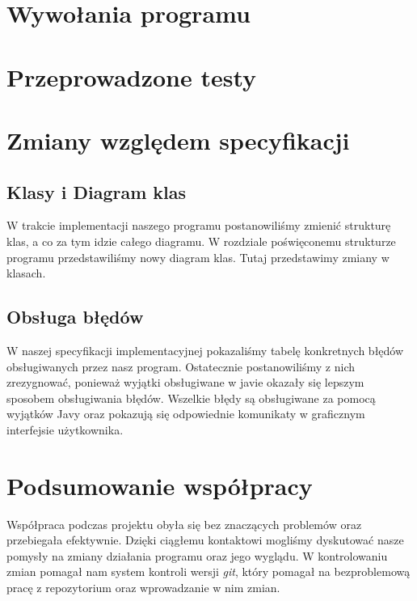 \documentclass[10pt, a4paper]{report}
\begin{document}
\newpage

\section{Wywołania programu}\label{sec:wywołania-programu}


\section{Przeprowadzone testy}\label{sec:przeprowadzone-testy}


\section{Zmiany względem specyfikacji}\label{sec:zmiany-względem-specyfikacji}

\subsection{Klasy i Diagram klas}\label{subsec:klasy-i-diagram-klas}
W trakcie implementacji naszego programu postanowiliśmy zmienić strukturę klas, a co za tym idzie całego diagramu. W rozdziale poświęconemu strukturze programu przedstawiliśmy nowy diagram klas.
Tutaj przedstawimy zmiany w klasach.

\subsection{Obsługa błędów}\label{subsec:obsługa-błędów}
W naszej specyfikacji implementacyjnej pokazaliśmy tabelę konkretnych błędów obsługiwanych przez nasz program. Ostatecznie postanowiliśmy z nich zrezygnować, ponieważ wyjątki obsługiwane w javie okazały się lepszym
sposobem obsługiwania błędów. Wszelkie błędy są obsługiwane za pomocą wyjątków Javy oraz pokazują się odpowiednie komunikaty w graficznym interfejsie użytkownika.

\section{Podsumowanie współpracy}\label{sec:podsumowanie-współpracy}
Współpraca podczas projektu obyła się bez znaczących problemów oraz przebiegała efektywnie.
Dzięki ciągłemu kontaktowi mogliśmy dyskutować nasze pomysły na zmiany działania programu oraz jego wyglądu.
W kontrolowaniu zmian pomagał nam system kontroli wersji \textit{git}, który pomagał na bezproblemową pracę z repozytorium oraz wprowadzanie w nim zmian.
\end{document}
